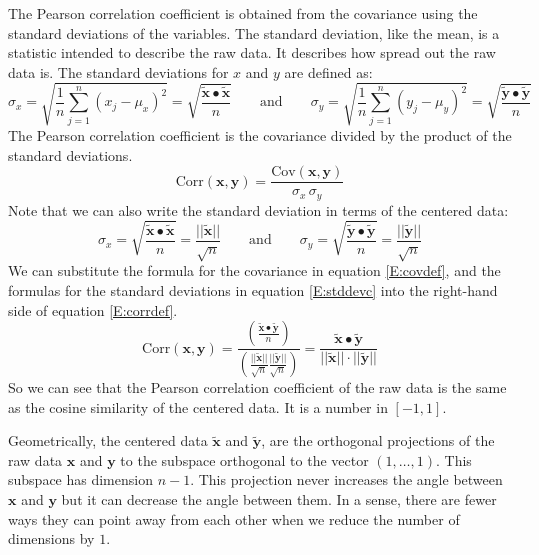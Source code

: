    The Pearson correlation coefficient is obtained from the covariance using
the standard deviations of the variables. The standard deviation, like the 
mean, is a statistic intended to describe the raw data. It describes how 
spread out the raw data is. The standard deviations for $x$ and $y$ are defined
as:
\begin{equation}
    \sigma_x = \sqrt{ \frac{1}{n} \sum_{j=1}^n (x_j - \mu_x)^2} = \sqrt{ \frac{\widetilde{\mathbf{x}} \bullet \widetilde{\mathbf{x}}}{n}}
\qquad \mbox{and} \qquad 
    \sigma_y = \sqrt{ \frac{1}{n} \sum_{j=1}^n (y_j - \mu_y)^2} = \sqrt{ \frac{\widetilde{\mathbf{y}} \bullet \widetilde{\mathbf{y}}}{n}}
\end{equation}
The Pearson correlation coefficient is the covariance divided by the product of
the standard deviations.
\begin{equation}\label{E:corrdef}
\mathrm{Corr}(\mathbf{x}, \mathbf{y}) = 
\frac{\mathrm{Cov}(\mathbf{x}, \mathbf{y})}{\sigma_x \, \sigma_y}
\end{equation}
Note that we can also write the standard deviation in terms of the centered data:
\begin{equation}\label{E:stddevc}
  \sigma_x = \sqrt{ \frac{\widetilde{\mathbf{x}} \bullet \widetilde{\mathbf{x}}}{n}}
= \frac{||\widetilde{\mathbf{x}}||}{\sqrt{n}}
\qquad \mbox{and} \qquad 
  \sigma_y = \sqrt{ \frac{\widetilde{\mathbf{y}} \bullet \widetilde{\mathbf{y}}}{n}}
= \frac{||\widetilde{\mathbf{y}}||}{\sqrt{n}}
\end{equation}
We can substitute the formula for the covariance in equation \eqref{E:covdef},
and the formulas for the standard deviations in equation \eqref{E:stddevc}
into the right-hand side of equation \eqref{E:corrdef}.
\begin{equation}
\mathrm{Corr}(\mathbf{x}, \mathbf{y}) = 
\frac{\left(\displaystyle{\frac{\widetilde{\mathbf{x}} \bullet 
                                                 \widetilde{\mathbf{y}}}{n}}\right)}
     {\left(\displaystyle{\frac{||\widetilde{\mathbf{x}}||}{\sqrt{n}}
               \frac{||\widetilde{\mathbf{y}}||}{\sqrt{n}} }\right)}
= \frac{\widetilde{\mathbf{x}} \bullet \widetilde{\mathbf{y}}}
       {||\widetilde{\mathbf{x}}|| \cdot ||\widetilde{\mathbf{y}}||} 
\end{equation}
So we can see that the Pearson correlation coefficient of the raw data is the
same as the cosine similarity of the centered data. It is a number in 
$[-1,1]$. 

    Geometrically, the centered data $\widetilde{\mathbf{x}}$ and 
$\widetilde{\mathbf{y}}$, are the orthogonal projections of the raw data 
$\mathbf{x}$ and $\mathbf{y}$ to the subspace orthogonal to the vector 
$(1, \dots, 1)$. This subspace has dimension $n - 1$. This projection 
never increases the angle between $\mathbf{x}$ and $\mathbf{y}$ but it can 
decrease the angle between them. In a sense, there are fewer ways they can point
away from each other when we reduce the number of dimensions by $1$. 


